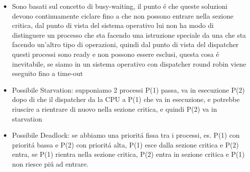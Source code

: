 \begin{itemize}
    \item Sono basati sul concetto di busy-waiting, il punto é che queste soluzioni devono continuamente ciclare fino a che non possono entrare nella sezione critica, dal punto di vista del sistema operativo lui non ha modo di distinguere un processo che sta facendo una istruzione speciale da una che sta facendo un'altro tipo di operazioni, quindi dal punto di vista del dispatcher questi processi sono ready e non possono essere esclusi, questa cosa é inevitabile, se siamo in un sistema operativo con dispatcher round robin viene eseguito fino a time-out
    \item Possibile Starvation: supponiamo 2 processi P(1) passa, va in esecuzione P(2) dopo di che il dispatcher da la CPU a P(1) che va in esecuzione, e potrebbe riuscire a rientrare di nuovo nella sezione critica, e quindi P(2) va in starvation
    \item Possibile Deadlock: se abbiamo una prioritá fissa tra i processi, es. P(1) con prioritá bassa e P(2) con prioritá alta, P(1) esce dalla sezione critica e P(2) entra, se P(1) rientra nella sezione critica, P(2) entra in sezione critica e P(1) non riesce piú ad entrare.
\end{itemize}
